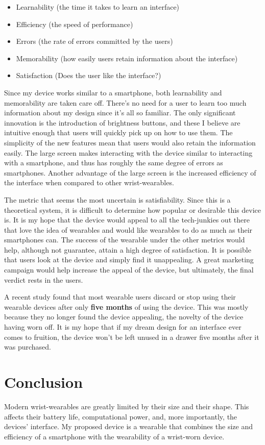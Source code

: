 \documentclass[11pt]{article}
\newcommand{\myreferences}{references}
\begin{document}
\begin{itemize}
  \item Learnability (the time it takes to learn an interface)
  \item Efficiency (the speed of performance)
  \item Errors (the rate of errors committed by the users)
  \item Memorability (how easily users retain information about the interface)
  \item Satisfaction (Does the user like the interface?)
\end{itemize} 
 
Since my device works similar to a smartphone, both learnability and memorability are taken care off. There's no need for a user to learn too much information about my design since it's all so familiar. The only significant innovation is the introduction of brightness buttons, and these I believe are intuitive enough that users will quickly pick up on how to use them. The simplicity of the new features mean that users would also retain the information easily. The large screen makes interacting with the device similar to interacting with a smartphone, and thus has roughly the same degree of errors as smartphones. Another advantage of the large screen is the increased efficiency of the interface when compared to other wrist-wearables. 

The metric that seems the most uncertain is satisfiability. Since this is a theoretical system, it is difficult to determine how popular or desirable this device is. It is my hope that the device would appeal to all the tech-junkies out there that love the idea of wearables and would like wearables to do as much as their smartphones can. The success of the wearable under the other metrics would help, although not guarantee, attain a high degree of satisfaction. It is possible that users look at the device and simply find it unappealing. A great marketing campaign would help increase the appeal of the device, but ultimately, the final verdict rests in the users. 

A recent study found that most wearable users discard or stop using their wearable devices after only \textbf{five months} of using the device. This was mostly because they no longer found the device appealing, the novelty of the device having worn off. It is my hope that if my dream design for an interface ever comes to fruition, the device won't be left unused in a drawer five months after it was purchased.

\section{Conclusion}

Modern wrist-wearables are greatly limited by their size and their shape. This affects their battery life, computational power, and, more importantly, the devices' interface. My proposed device is a wearable that combines the size and efficiency of a smartphone with the wearability of a wrist-worn device.



\end{document}
